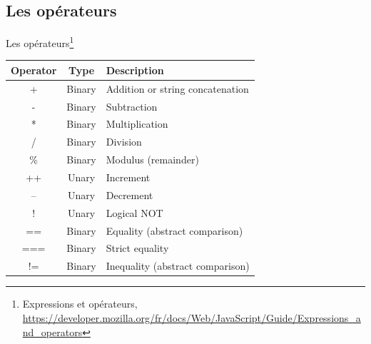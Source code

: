 \documentclass{beamer}
\begin{document}
    \subsection{Les opérateurs}\label{subsec:operators}
    \begin{frame}{Les opérateurs\footnote{\label{operators}Expressions et opérateurs, \url{https://developer.mozilla.org/fr/docs/Web/JavaScript/Guide/Expressions_and_operators}}}
        \begin{tiny}
            \begin{table}[h!]
                \centering
                \begin{tabular}{|c|c|p{8cm}|}
                    \hline
                    \textbf{Operator} & \textbf{Type} & \textbf{Description}             \\
                    \hline
                    +                 & Binary        & Addition or string concatenation \\
                    \hline
                    -                 & Binary        & Subtraction                      \\
                    \hline
                    *                 & Binary        & Multiplication                   \\
                    \hline
                    /                 & Binary        & Division                         \\
                    \hline
                    \%                & Binary        & Modulus (remainder)              \\
                    \hline
                    ++                & Unary         & Increment                        \\
                    \hline
                    --                & Unary         & Decrement                        \\
                    \hline
                    !                 & Unary         & Logical NOT                      \\
                    \hline
                    ==                & Binary        & Equality (abstract comparison)   \\
                    \hline
                    ===               & Binary        & Strict equality                  \\
                    \hline
                    !=                & Binary        & Inequality (abstract comparison) \\
                    \hline

\end{tabular}
\end{table}
\end{tiny}
\end{frame}
\end{document}
